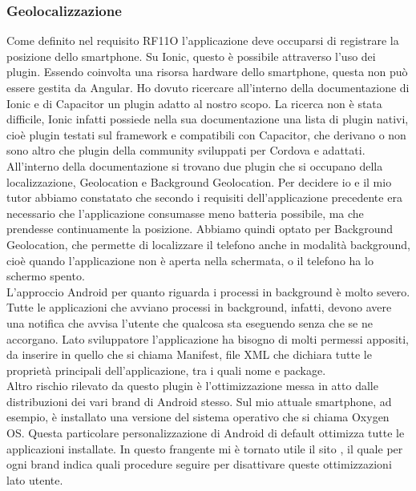 \subsubsection{Geolocalizzazione}
Come definito nel requisito RF11O l'applicazione deve occuparsi di registrare la posizione dello smartphone. Su Ionic, questo è possibile
attraverso l'uso dei plugin. Essendo coinvolta una risorsa hardware dello smartphone, questa non può essere gestita da Angular. Ho dovuto
ricercare all'interno della documentazione di Ionic e di Capacitor un plugin adatto al nostro scopo. La ricerca non è stata difficile, Ionic
infatti possiede nella sua documentazione una lista di plugin nativi, cioè plugin testati sul framework e compatibili con Capacitor, che
derivano o non sono altro che plugin della community sviluppati per Cordova e adattati. \\
\noindent All'interno della documentazione si trovano due plugin che si occupano della localizzazione, Geolocation e Background Geolocation.
Per decidere io e il mio tutor abbiamo constatato che secondo i requisiti dell'applicazione precedente era necessario che l'applicazione
consumasse meno batteria possibile, ma che prendesse continuamente la posizione. Abbiamo quindi optato per Background Geolocation, che
permette di localizzare il telefono anche in modalità \gls{background}, cioè quando l'applicazione non è aperta nella schermata, o il telefono ha
lo schermo spento. \\
\noindent L'approccio Android per quanto riguarda i processi in background è molto severo. Tutte le applicazioni che avviano processi in
background, infatti, devono avere una notifica che avvisa l'utente che qualcosa sta eseguendo senza che se ne accorgano. Lato sviluppatore
l'applicazione ha bisogno di molti permessi appositi, da inserire in quello che si chiama Manifest, file XML che dichiara tutte le
proprietà principali dell'applicazione, tra i quali nome e package. \\
Altro rischio rilevato da questo plugin è l'ottimizzazione messa in atto dalle distribuzioni dei vari brand di Android
stesso. Sul mio attuale smartphone, ad esempio, è installato una versione del sistema operativo che si chiama Oxygen OS.
Questa particolare personalizzazione di \gls{Android} di default ottimizza tutte le applicazioni installate. In questo
frangente mi è tornato utile il sito \cite{site:dontkillmyapp}, il quale per ogni brand indica quali procedure seguire per
disattivare queste ottimizzazioni lato utente.

